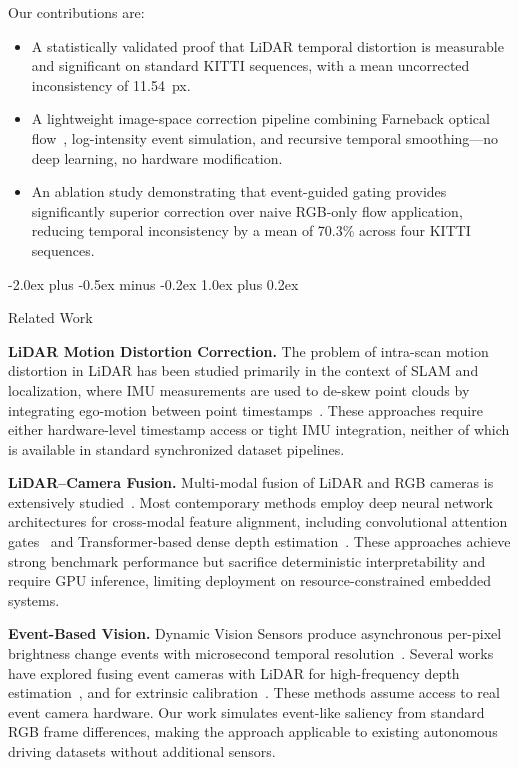 \documentclass[conference]{IEEEtran}
\makeatletter
\def\section{\@startsection{section}{1}{\z@}
  {-2.0ex plus -0.5ex minus -0.2ex}
  {1.0ex plus 0.2ex}
  {\normalfont\large\bfseries\raggedright}}
\makeatother
\begin{document}
Our contributions are:
\begin{itemize}
  \item A statistically validated proof that LiDAR temporal
    distortion is measurable and significant on standard KITTI
    sequences, with a mean uncorrected inconsistency of 11.54~px.
  \item A lightweight image-space correction pipeline combining
    Farneback optical flow~\cite{farneback}, log-intensity event
    simulation, and recursive temporal smoothing---no deep learning,
    no hardware modification.
  \item An ablation study demonstrating that event-guided gating
    provides significantly superior correction over naive RGB-only
    flow application, reducing temporal inconsistency by a mean of
    70.3\% across four KITTI sequences.
\end{itemize}

\section{Related Work}

\textbf{LiDAR Motion Distortion Correction.}
The problem of intra-scan motion distortion in LiDAR has been studied
primarily in the context of SLAM and localization, where IMU
measurements are used to de-skew point clouds by integrating
ego-motion between point timestamps~\cite{kitti}. These approaches
require either hardware-level timestamp access or tight IMU
integration, neither of which is available in standard synchronized
dataset pipelines.

\textbf{LiDAR--Camera Fusion.}
Multi-modal fusion of LiDAR and RGB cameras is extensively
studied~\cite{huang2021,delta2025}. Most contemporary methods employ
deep neural network architectures for cross-modal feature alignment,
including convolutional attention gates~\cite{huang2021} and
Transformer-based dense depth estimation~\cite{delta2025}. These
approaches achieve strong benchmark performance but sacrifice
deterministic interpretability and require GPU inference, limiting
deployment on resource-constrained embedded systems.

\textbf{Event-Based Vision.}
Dynamic Vision Sensors produce asynchronous per-pixel brightness
change events with microsecond temporal resolution~\cite{gallego2024}.
Several works have explored fusing event cameras with LiDAR for
high-frequency depth estimation~\cite{li2021,bartolomei2024}, and
for extrinsic calibration~\cite{song2018}. These methods assume
access to real event camera hardware. Our work simulates event-like
saliency from standard RGB frame differences, making the approach
applicable to existing autonomous driving datasets without additional
sensors.
\end{document}
